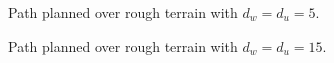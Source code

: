 				\begin{figure}
					\centering
					\caption{Path planned over rough terrain with $d_{w}=d_{u}=5$.}
					\label{fig::terrain_path_2}
				\end{figure}
				\begin{figure}
					\centering
					\caption{Path planned over rough terrain with $d_{w}=d_{u}=15$.}
					\label{fig::terrain_path_3}
				\end{figure}
